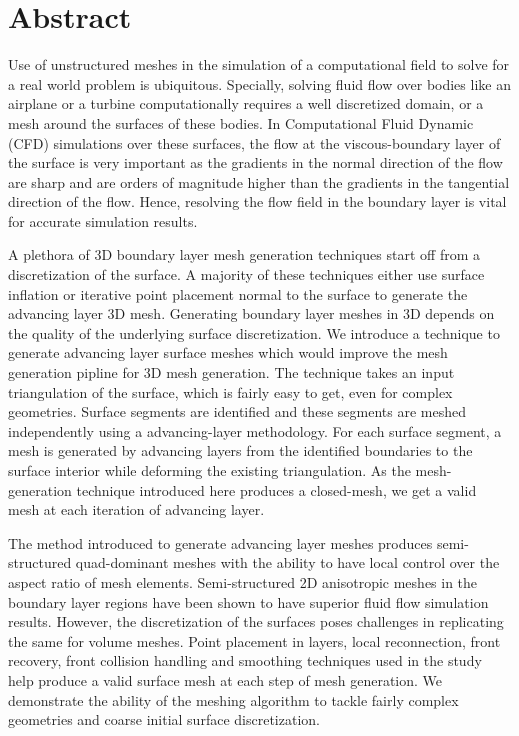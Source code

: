 
\chapter{Abstract}

Use of unstructured meshes in the simulation of a computational field to solve for a real world problem is ubiquitous. Specially, solving fluid flow over bodies like an airplane or a turbine computationally requires a well discretized domain, or a mesh around the surfaces of these bodies. In Computational Fluid Dynamic (CFD) simulations over these surfaces, the flow at the viscous-boundary layer of the surface is very important as the gradients in the normal direction of the flow are sharp and are orders of magnitude higher than the gradients in the tangential direction of the flow. Hence, resolving the flow field in the boundary layer is vital for accurate simulation results.

A plethora of 3D boundary layer mesh generation techniques start off from a discretization of the surface. A majority of these techniques either use surface inflation or iterative point placement normal to the surface to generate the advancing layer 3D mesh. Generating boundary layer meshes in 3D depends on the quality of the underlying surface discretization. We introduce a technique to generate advancing layer surface meshes which would improve the mesh generation pipline for 3D mesh generation. The technique takes an input triangulation of the surface, which is fairly easy to get, even for complex geometries. Surface segments are identified and these segments are meshed independently using a advancing-layer methodology. For each surface segment, a mesh is generated by advancing layers from the identified boundaries to the surface interior while deforming the existing triangulation. As the mesh-generation technique introduced here produces a closed-mesh, we get a valid mesh at each iteration of advancing layer.

The method introduced to generate advancing layer meshes produces semi-structured quad-dominant meshes with the ability to have local control over the aspect ratio of mesh elements. Semi-structured 2D anisotropic meshes in the boundary layer regions have been shown to have superior fluid flow simulation results. However, the discretization of the surfaces poses challenges in replicating the same for volume meshes. Point placement in layers, local reconnection, front recovery, front collision handling and smoothing techniques used in the study help produce a valid surface mesh at each step of mesh generation. We demonstrate the ability of the meshing algorithm to tackle fairly complex geometries and coarse initial surface discretization.

